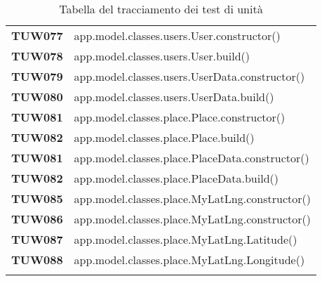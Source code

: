 \documentclass[../piano-di-qualifica.tex]{subfiles}
\begin{document}
\begin{longtable}[H]{>{\centering\bfseries}m{3cm} >{}m{13cm}}

TUW077             & app.model.classes.users.User.constructor\@()\\ 

TUW078             & app.model.classes.users.User.build\@()\\ 
 

TUW079             & app.model.classes.users.UserData.constructor\@()\\ 

TUW080             & app.model.classes.users.UserData.build\@()\\ 
 

TUW081             & app.model.classes.place.Place.constructor\@()\\ 

TUW082             & app.model.classes.place.Place.build\@()\\ 
 

TUW081             & app.model.classes.place.PlaceData.constructor\@()\\ 

TUW082             & app.model.classes.place.PlaceData.build\@()\\ 
 

TUW085              & app.model.classes.place.MyLatLng.constructor\@()\\ 

TUW086             & app.model.classes.place.MyLatLng.constructor\@()\\ 
 
TUW087             & app.model.classes.place.MyLatLng.Latitude\@()\\  

TUW088             & app.model.classes.place.MyLatLng.Longitude\@()\\ 



  \rowcolor{white}
  \caption{Tabella del tracciamento dei test di unità}%
  \label{tab:test_di_unità}
\end{longtable}








\end{document}
